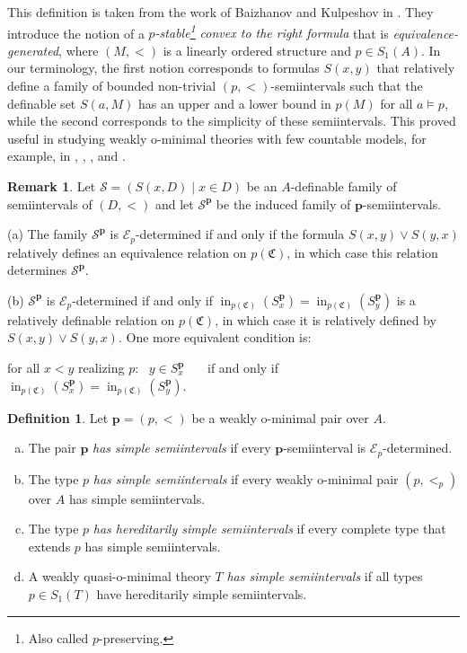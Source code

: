\documentclass{amsart}
\theoremstyle{definition}
\theoremstyle{definition}
\newtheorem{Definition}[Theorem]{Definition}
\newtheorem{Remark}[Theorem]{Remark}
\newcommand{\Mon}{\mathfrak C}
\def\pp{\mathbf{p}}
\DeclareMathOperator{\supin}{in}
\begin{document}
This definition is taken from the work of Baizhanov and Kulpeshov in \cite{Baizhanov2006}. They introduce the notion of a {\it $p$-stable\footnote{Also called $p$-preserving.} convex to the right formula} that is {\it equivalence-generated}, where $(M,<)$ is a linearly ordered structure and $p\in S_1(A)$. In our terminology, the first notion corresponds to formulas $S(x,y)$ that relatively define a family of bounded non-trivial $(p,<)$-semiintervals such that the definable set $S(a,M)$ has an upper and a lower bound in $p(M)$ for all $a\models p$, while the second corresponds to the simplicity of these semiintervals. This proved useful in studying weakly o-minimal theories with few countable models, for example, in  \cite{Kulpeshov2007}, \cite{Altayeva2020}, \cite{Kulpeshov2020}, and \cite{Kulpeshov2021}.


 

\begin{Remark}\label{Remark 1.6}
Let $\mathcal S=(S(x,D)\mid x\in D)$ be an $A$-definable family of semiintervals of $(D,<)$ and let $\mathcal S^{\mathbf p}$ be the induced family of $\mathbf p$-semiintervals. 

(a) The family $\mathcal S^{\mathbf p}$ is $\mathcal E_p$-determined if and only if the formula $S(x,y)\lor S(y,x)$ relatively defines an equivalence relation on $p(\Mon)$, in which case this relation determines $\mathcal S^{\mathbf p}$. 

(b) $\mathcal S^\pp$ is $\mathcal E_p$-determined if and only if $\supin_{p(\Mon)} (S_x^\pp)=\supin_{p(\Mon)} (S_y^\pp)$ is a relatively definable relation on $p(\Mon)$, in which case it is relatively defined by $S(x,y)\vee S(y,x)$. One more equivalent condition is: 
\begin{center}for all $x<y$ realizing $p$: \ $y\in S^{\mathbf p}_x$ \ \ \ if and only if \ \ \ $\supin_{p(\Mon)} (S^{\mathbf p}_x)=\supin_{p(\Mon)} (S^{\mathbf p}_y)$.
\end{center}
\end{Remark}




\begin{Definition} Let $\mathbf p=(p,<)$ be a weakly o-minimal pair over $A$.
\begin{enumerate}[(a)]
\item  The pair $\mathbf p$ {\em has simple semiintervals} if every $\mathbf p$-semiinterval is $\mathcal E_p$-determined. 
 
\item The type $p$ {\em has simple semiintervals} if every weakly o-minimal pair $(p,<_p)$ over $A$ has simple semiintervals. 

\item The type $p$ {\em has hereditarily simple semiintervals} if every complete type that extends $p$ has simple semiintervals. 

\item A weakly quasi-o-minimal theory $T$ {\it has simple semiintervals} if all types $p\in S_1(T)$ have hereditarily simple semiintervals.  
\end{enumerate}
\end{Definition}
\end{document}
